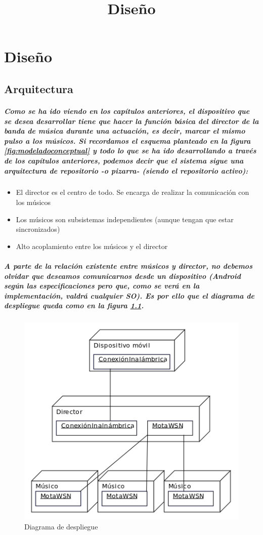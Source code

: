 \chapter{Diseño}
\title{Diseño}
\label{cap:Diseno}

\section{Arquitectura}
\paragraph{
Como se ha ido viendo en los capítulos anteriores, el dispositivo que se desea desarrollar
tiene que hacer la función básica del director de la banda de música durante una actuación,
es decir, marcar el mismo pulso a los músicos.
Si recordamos el esquema planteado en la figura \ref{fig:modeladoconceptual} y todo lo
que se ha ido desarrollando a través de los capítulos anteriores, podemos decir
que el sistema sigue una arquitectura de repositorio -o pizarra- (siendo el repositorio activo):
}
\begin{itemize}
  \item El director es el centro de todo. Se encarga de realizar la comunicación con los músicos
  \item Los músicos son subsistemas independientes (aunque tengan que estar sincronizados)
  \item Alto acoplamiento entre los músicos y el director
\end{itemize}

\paragraph{
A parte de la relación existente entre músicos y director, no debemos olvidar que
deseamos comunicarnos desde un dispositivo (Android según las especificaciones pero que,
como se verá en la implementación, valdrá cualquier SO). Es por ello que el diagrama
de despliegue queda como en la figura \ref{fig:diagramadespliegue}.
}

\begin{figure}[htb]
\centering
\includegraphics[width=1\textwidth]{./imagenes/diagramadespliegue}
\caption{Diagrama de despliegue} \label{fig:diagramadespliegue}
\end{figure}
